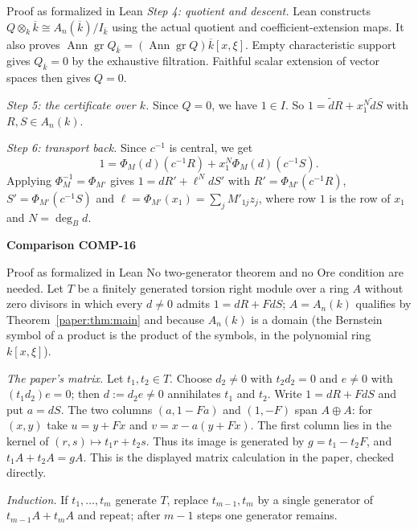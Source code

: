 \documentclass[11pt]{amsart}
\numberwithin{equation}{section}
\theoremstyle{plain}
\theoremstyle{remark}
\newcommand{\gr}{\operatorname{gr}}
\newcommand{\Ann}{\operatorname{Ann}}
\newcommand{\Kbar}{\overline{k}}
\begin{document}
\begin{AIaddition}{Proof as formalized in Lean}
\emph{Step 4: quotient and descent.} Lean constructs
$Q\otimes_k\Kbar\cong A_n(\Kbar)/I_{\Kbar}$ using the actual quotient
and coefficient-extension maps. It also proves
$\Ann\gr Q_{\Kbar}=(\Ann\gr Q)\Kbar[x,\xi]$.
Empty characteristic support gives $Q_{\Kbar}=0$ by the exhaustive
filtration. Faithful scalar extension of vector spaces then gives $Q=0$.

\emph{Step 5: the certificate over $k$.} Since $Q=0$, we have $1\in I$.
So $1=\tilde dR+x_1^N\tilde dS$ with $R,S\in A_n(k)$.

\emph{Step 6: transport back.} Since $c^{-1}$ is central, we get
\[1=\Phi_M(d)(c^{-1}R)+x_1^N\Phi_M(d)(c^{-1}S).\] Applying
$\Phi_M^{-1}=\Phi_{M'}$ gives $1=dR'+\ell^NdS'$ with
$R'=\Phi_{M'}(c^{-1}R)$, $S'=\Phi_{M'}(c^{-1}S)$ and
$\ell=\Phi_{M'}(x_1)=\sum_jM'_{1j}z_j$, where row $1$ is the row of $x_1$
and $N=\deg_Bd$.
\end{AIaddition}

\par\bigskip\noindent{}\hypertarget{comparison-COMP-16}{\textbf{Comparison COMP-16}}\label{comparison-COMP-16}\par\smallskip
\begin{AIaddition}{Proof as formalized in Lean}
No two-generator theorem and no Ore condition are needed. Let $T$ be a finitely
generated torsion right module over a ring $A$ without zero divisors in which
every $d\ne0$ admits $1=dR+FdS$; $A=A_n(k)$ qualifies by Theorem~\ref{paper:thm:main}
and because $A_n(k)$ is a domain (the Bernstein symbol of a product is the
product of the symbols, in the polynomial ring $k[x,\xi]$).

\emph{The paper's matrix.} Let $t_1,t_2\in T$. Choose $d_2\ne0$ with $t_2d_2=0$ and
$e\ne0$ with $(t_1d_2)e=0$; then $d:=d_2e\ne0$ annihilates $t_1$ and $t_2$. Write
$1=dR+FdS$ and put $a=dS$. The two columns $(a,1-Fa)$ and $(1,-F)$
span $A\oplus A$: for $(x,y)$ take $u=y+Fx$ and $v=x-a(y+Fx)$.
The first column lies in the kernel of $(r,s)\mapsto t_1r+t_2s$.
Thus its image is generated by $g=t_1-t_2F$, and
$t_1A+t_2A=gA$. This is the displayed matrix calculation in the paper,
checked directly.

\emph{Induction.} If $t_1,\dots,t_m$ generate $T$, replace $t_{m-1},t_m$ by a
single generator of $t_{m-1}A+t_mA$ and repeat; after $m-1$ steps one generator
remains.
\end{AIaddition}

\ifshowleandetails
\end{document}
